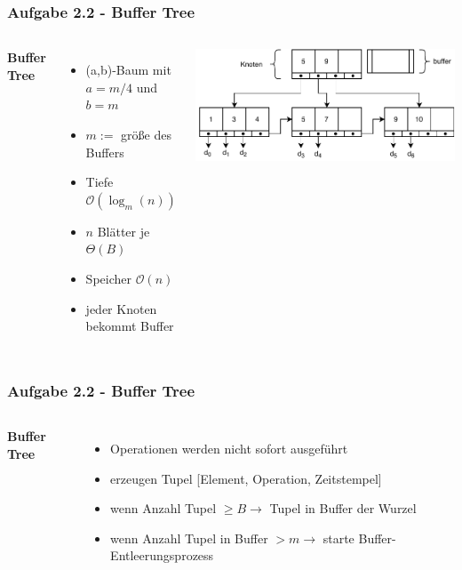 \documentclass[aspectratio=169]{beamer}
\begin{document}
\begin{frame}
\frametitle{Aufgabe 2.2 - Buffer Tree}
\begin{columns}[c] %
	
	\textbf{Buffer Tree}
	\begin{itemize}
		\item (a,b)-Baum mit $a=m/4$ und $b=m$
		\item $m:=$ größe des Buffers
		\item Tiefe $\mathcal{O}(\log_{m}(n))$
		\item $n$ Blätter je $\Theta(B)$
		\item Speicher $\mathcal{O}(n)$
		\item jeder Knoten bekommt Buffer
	\end{itemize}
	
	\includegraphics[scale=.55]{bufffer_tree_overview.pdf}
	

	
\end{columns}
\end{frame}
			

\begin{frame}
\frametitle{Aufgabe 2.2 - Buffer Tree}
\begin{columns}[c] %
	
	\textbf{Buffer Tree}
	\begin{itemize}
		\item Operationen werden nicht sofort ausgeführt
		\item erzeugen Tupel [Element, Operation, Zeitstempel]
		\item wenn Anzahl Tupel $ \geq B \rightarrow$ Tupel in Buffer der Wurzel
		\item wenn Anzahl Tupel in Buffer $> m \rightarrow $ starte Buffer-Entleerungsprozess
	\end{itemize}
	

	
\end{columns}
\end{frame}
				
\end{document}
